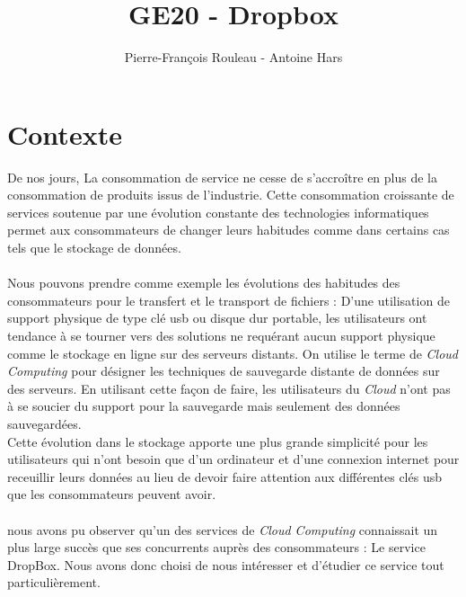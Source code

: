 \documentclass[a4paper, 10pt]{article}
\title{GE20 - Dropbox}
\author{Pierre-François Rouleau - Antoine Hars}
\begin{document}
\maketitle

\section*{Contexte}
De nos jours, La consommation de service ne cesse de s'accro\^itre en plus de la consommation de produits issus de l'industrie.
Cette consommation croissante de services soutenue par une \'evolution constante des technologies informatiques permet aux consommateurs
de changer leurs habitudes comme dans certains cas tels que le stockage de donn\'ees.\\ \\
Nous pouvons prendre comme exemple les \'evolutions des habitudes des consommateurs pour le transfert et le transport de fichiers :
D'une utilisation de support physique de type cl\'e usb ou disque dur portable, les utilisateurs ont tendance \`a se tourner vers des solutions
ne requ\'erant aucun support physique comme le stockage en ligne sur des serveurs distants.
On utilise le terme de \textit{Cloud Computing} pour d\'esigner les techniques de sauvegarde distante de donn\'ees sur des serveurs.
En utilisant cette façon de faire, les utilisateurs du \textit{Cloud} n'ont pas \`a se soucier du support pour la sauvegarde mais
seulement des donn\'ees sauvegard\'ees.\\
Cette \'evolution dans le stockage apporte une plus grande simplicit\'e pour les utilisateurs
qui n'ont besoin que d'un ordinateur et d'une connexion internet pour receuillir leurs donn\'ees
au lieu de devoir faire attention aux diff\'erentes cl\'es usb que les consommateurs peuvent avoir.\\ \\
nous avons pu observer qu'un des services de \textit{Cloud Computing} connaissait un plus large succ\`es
que ses concurrents aupr\`es des consommateurs : Le service DropBox.
Nous avons donc choisi de nous int\'eresser et d'\'etudier ce service tout particuli\`erement.
\end{document}
